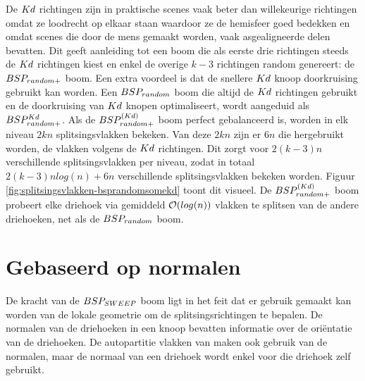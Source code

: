 De $Kd$ richtingen zijn in praktische scenes vaak beter dan willekeurige richtingen omdat ze loodrecht op elkaar staan waardoor ze de hemisfeer goed bedekken en omdat scenes die door de mens gemaakt worden, vaak asgealigneerde delen bevatten.
Dit geeft aanleiding tot een boom die als eerste drie richtingen steeds de $Kd$ richtingen kiest en enkel de overige $k - 3$ richtingen random genereert: de $BSP_{random+}$ boom. Een extra voordeel is dat de snellere $Kd$ knoop doorkruising gebruikt kan worden. Een $BSP_{random}$ boom die altijd de $Kd$ richtingen gebruikt en de doorkruising van $Kd$ knopen optimaliseert, wordt aangeduid als $BSP^{Kd}_{random+}$. 
Als de $BSP^{(Kd)}_{random+}$ boom perfect gebalanceerd is, worden in elk niveau $2kn$ splitsingsvlakken bekeken.
Van deze $2kn$ zijn er $6n$ die hergebruikt worden, de vlakken volgens de $Kd$ richtingen.
Dit zorgt voor $2(k-3)n$ verschillende splitsingsvlakken per niveau, zodat in totaal $2(k-3)nlog(n) + 6n$ verschillende splitsingsvlakken bekeken worden.
Figuur \ref{fig:splitsingsvlakken-bsprandomsomekd} toont dit visueel.
De $BSP^{(Kd)}_{random+}$ boom probeert elke driehoek via gemiddeld $\mathcal{O}(log(n))$ vlakken te splitsen van de andere driehoeken, net als  de $BSP_{random}$ boom.\\



\section{Gebaseerd op normalen}
    De kracht van de $BSP_{SWEEP}$ boom ligt in het feit dat er gebruik gemaakt kan worden van de lokale geometrie om de splitsingsrichtingen te bepalen.
    De normalen van de driehoeken in een knoop bevatten informatie over de oriëntatie van de driehoeken.
    De autopartitie vlakken van \authorIze{} maken ook gebruik van de normalen, maar de normaal van een driehoek wordt enkel voor die driehoek zelf gebruikt.
    
